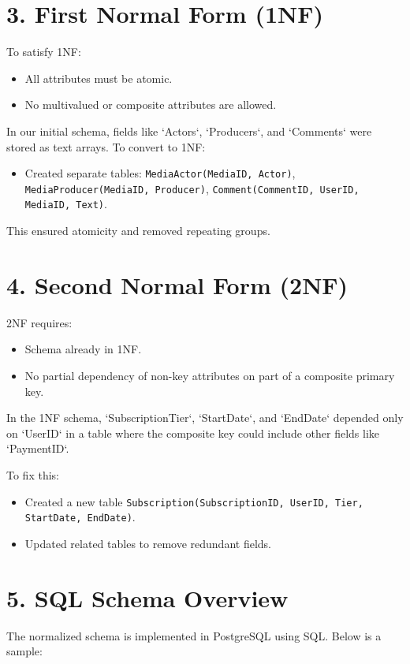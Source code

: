 \documentclass[12pt]{article}
\begin{document}
\newpage
\section*{3. First Normal Form (1NF)}
To satisfy 1NF:
\begin{itemize}
    \item All attributes must be atomic.
    \item No multivalued or composite attributes are allowed.
\end{itemize}

In our initial schema, fields like `Actors`, `Producers`, and `Comments` were stored as text arrays. To convert to 1NF:
\begin{itemize}
    \item Created separate tables: \texttt{MediaActor(MediaID, Actor)}, \texttt{MediaProducer(MediaID, Producer)}, \texttt{Comment(CommentID, UserID, MediaID, Text)}.
\end{itemize}

This ensured atomicity and removed repeating groups.

\section*{4. Second Normal Form (2NF)}
2NF requires:
\begin{itemize}
    \item Schema already in 1NF.
    \item No partial dependency of non-key attributes on part of a composite primary key.
\end{itemize}

In the 1NF schema, `SubscriptionTier`, `StartDate`, and `EndDate` depended only on `UserID` in a table where the composite key could include other fields like `PaymentID`.

To fix this:
\begin{itemize}
    \item Created a new table \texttt{Subscription(SubscriptionID, UserID, Tier, StartDate, EndDate)}.
    \item Updated related tables to remove redundant fields.
\end{itemize}

\section*{5. SQL Schema Overview}
The normalized schema is implemented in PostgreSQL using SQL. Below is a sample:
\end{document}
